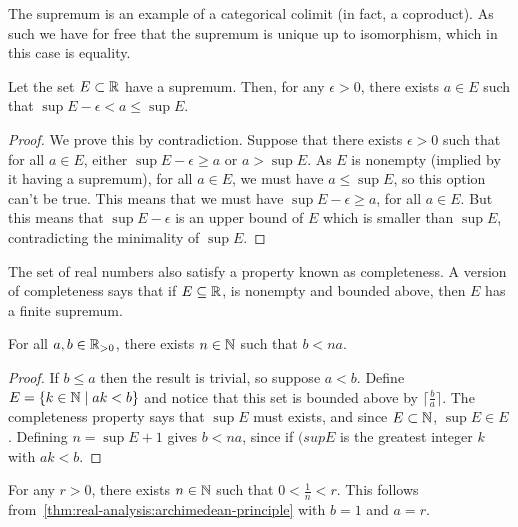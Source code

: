 \begin{categorybox}
  The supremum is an example of a categorical colimit (in fact, a coproduct). As such we have for free that the supremum is unique up to isomorphism, which in this case is equality.
\end{categorybox}

\begin{theorem}
  Let the set \(E \subset \mathbb{R}\) have a supremum. Then, for any \(\epsilon > 0\), there exists \(a \in E\) such that \(\sup E - \epsilon < a \leq \sup E\).
\end{theorem}

\begin{proof}
  We prove this by contradiction. Suppose that there exists \(\epsilon > 0\) such that for all \(a \in E\), either \(\sup E - \epsilon \geq a\) or \(a > \sup E\). As \(E\) is nonempty (implied by it having a supremum), for all \(a \in E\), we must have \(a \leq \sup E\), so this option can't be true. This means that we must have \(\sup E - \epsilon \geq a\), for all \(a \in E\). But this means that \(\sup E - \epsilon\) is an upper bound of \(E\) which is smaller than \(\sup E\), contradicting the minimality of \(\sup E\).
\end{proof}

The set of real numbers also satisfy a property known as completeness. A version of completeness says that if \(E \subseteq \mathbb{R}\), is nonempty and bounded above, then \(E\) has a finite supremum.

\begin{theorem}\label{thm:real-analysis:archimedean-principle}
  For all \(a, b \in \mathbb{R}_{> 0}\), there exists \(n \in \mathbb{N}\) such that \(b < na\).
\end{theorem}

\begin{proof}
  If \(b \leq a\) then the result is trivial, so suppose \(a < b\). Define \(E = \{ k \in \mathbb{N} \mid ak < b \}\) and notice that this set is bounded above by \(\lceil \frac b a \rceil\). The completeness property says that \(\sup E\) must exists, and since \(E \subset \mathbb{N}\), \(\sup E \in E\). Defining \(n = \sup E + 1\) gives \(b < n a\), since if \((sup E\) is the greatest integer \(k\) with \(ak < b\).
\end{proof}

\begin{example}
  For any \(r > 0\), there exists \(n \in \mathbb{N}\) such that \(0 < \frac 1 n < r\). This follows from~\ref{thm:real-analysis:archimedean-principle} with \(b = 1\) and \(a = r\).
\end{example}

